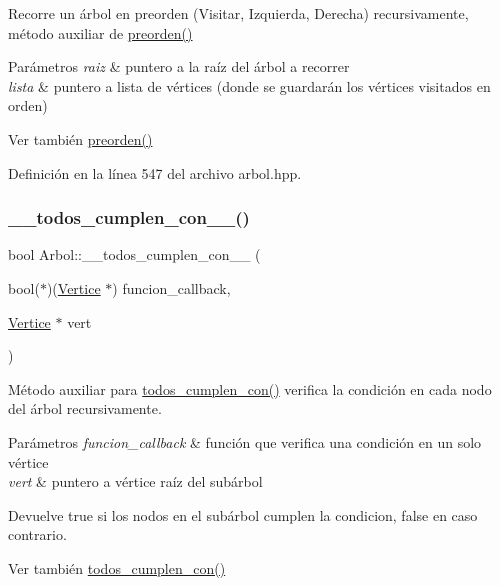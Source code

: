 Recorre un árbol en preorden (Visitar, Izquierda, Derecha) recursivamente, método auxiliar de \hyperlink{classArbol_a0ffdc60ce8f2267366681cc94cf6beea}{preorden()} 


\begin{DoxyParams}{Parámetros}
{\em raiz} & puntero a la raíz del árbol a recorrer \\
\hline
{\em lista} & puntero a lista de vértices (donde se guardarán los vértices visitados en orden) \\
\hline
\end{DoxyParams}
\begin{DoxySeeAlso}{Ver también}
\hyperlink{classArbol_a0ffdc60ce8f2267366681cc94cf6beea}{preorden()} 
\end{DoxySeeAlso}


Definición en la línea 547 del archivo arbol.\+hpp.

\mbox{\label{classArbol_a60b71d79b81a3a1083709ec264332975}} 
\subsubsection{\texorpdfstring{\+\_\+\+\_\+todos\+\_\+cumplen\+\_\+con\+\_\+\+\_\+()}{\_\_todos\_cumplen\_con\_\_()}}
{\footnotesize\ttfamily bool Arbol\+::\+\_\+\+\_\+todos\+\_\+cumplen\+\_\+con\+\_\+\+\_\+ (\begin{DoxyParamCaption}\item[{bool($\ast$)(\hyperlink{classVertice}{Vertice} $\ast$)}]{funcion\+\_\+callback,  }\item[{\hyperlink{classVertice}{Vertice} $\ast$}]{vert }\end{DoxyParamCaption})\hspace{0.3cm}{\ttfamily [protected]}}



Método auxiliar para \hyperlink{classArbol_aba4b09fef18152beb43e04fee7394f34}{todos\+\_\+cumplen\+\_\+con()} verifica la condición en cada nodo del árbol recursivamente. 


\begin{DoxyParams}{Parámetros}
{\em funcion\+\_\+callback} & función que verifica una condición en un solo vértice \\
\hline
{\em vert} & puntero a vértice raíz del subárbol \\
\hline
\end{DoxyParams}
\begin{DoxyReturn}{Devuelve}
true si los nodos en el subárbol cumplen la condicion, false en caso contrario. 
\end{DoxyReturn}
\begin{DoxySeeAlso}{Ver también}
\hyperlink{classArbol_aba4b09fef18152beb43e04fee7394f34}{todos\+\_\+cumplen\+\_\+con()} 
\end{DoxySeeAlso}


